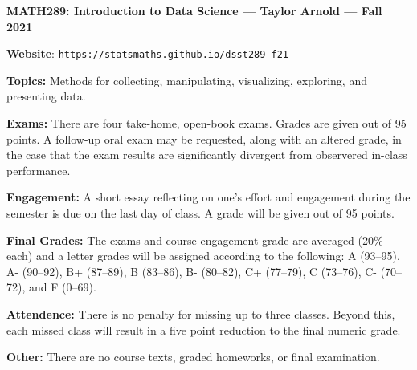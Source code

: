 \documentclass[11pt, a4paper]{article}
\begin{document}
\begin{center}
\textbf{MATH289: Introduction to Data Science --- Taylor Arnold --- Fall 2021}
\end{center}

\vspace{0.5cm}

\textbf{Website}: \texttt{https://statsmaths.github.io/dsst289-f21}

\bigskip

\textbf{Topics:}
Methods for collecting, manipulating, visualizing, exploring, and presenting
data.

\bigskip

\textbf{Exams:}
There are four take-home, open-book exams. Grades are given out of 95 points.
A follow-up oral exam may be requested, along with an altered grade, in the case
that the exam results are significantly divergent from observered in-class
performance.

\bigskip

\textbf{Engagement:}
A short essay reflecting on one's effort and engagement during the semester
is due on the last day of class. A grade will be given out of 95 points.

\bigskip

\textbf{Final Grades:}
The exams and course engagement grade are averaged (20\% each) and a letter
grades will be assigned according to the following:
             A (93--95), A- (90--92),
B+ (87--89), B (83--86), B- (80--82),
C+ (77--79), C (73--76), C- (70--72), and F (0--69).

\bigskip

\textbf{Attendence:}
There is no penalty for missing up to three classes. Beyond this, each missed
class will result in a five point reduction to the final numeric grade.

\bigskip

\textbf{Other:}
There are no course texts, graded homeworks, or final examination.

\vspace{0.25cm}

\begin{center}
\end{center}
\end{document}
